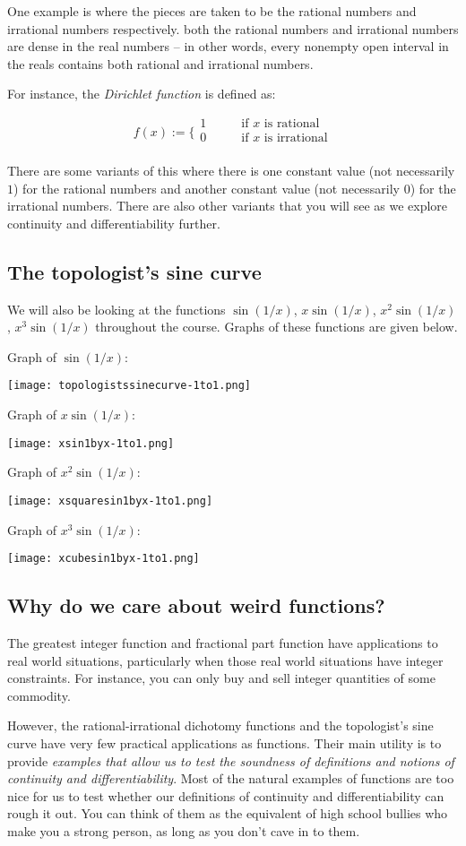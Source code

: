 \documentclass{amsart}
\begin{document}
One example is where the pieces are taken to be the rational numbers
and irrational numbers respectively. both the rational numbers and
irrational numbers are dense in the real numbers -- in other words,
every nonempty open interval in the reals contains both rational and
irrational numbers.

For instance, the {\em Dirichlet function} is defined as:

\begin{equation*}
  f(x) := \lbrace\begin{array}{rl}1 & \qquad \text{if $x$ is rational}\\0 & \qquad \text{if $x$ is irrational}\\\end{array}
\end{equation*}

There are some variants of this where there is one constant value (not
necessarily $1$) for the rational numbers and another constant value
(not necessarily $0$) for the irrational numbers. There are also other
variants that you will see as we explore continuity and
differentiability further.

\subsection{The topologist's sine curve}

We will also be looking at the functions $\sin(1/x)$, $x\sin(1/x)$,
$x^2\sin(1/x)$, $x^3\sin(1/x)$ throughout the course. Graphs of these
functions are given below.

Graph of $\sin(1/x)$:

\texttt{[image: topologistssinecurve-1to1.png]}

Graph of $x\sin(1/x)$:

\texttt{[image: xsin1byx-1to1.png]}

Graph of $x^2\sin(1/x)$:

\texttt{[image: xsquaresin1byx-1to1.png]}

Graph of $x^3\sin(1/x)$:

\texttt{[image: xcubesin1byx-1to1.png]}
 
\subsection{Why do we care about weird functions?}

The greatest integer function and fractional part function have
applications to real world situations, particularly when those real
world situations have integer constraints. For instance, you can only
buy and sell integer quantities of some commodity.

However, the rational-irrational dichotomy functions and the
topologist's sine curve have very few practical applications as
functions. Their main utility is to provide {\em examples that allow
us to test the soundness of definitions and notions of continuity and
differentiability}. Most of the natural examples of functions are too
nice for us to test whether our definitions of continuity and
differentiability can rough it out. You can think of them as the
equivalent of high school bullies who make you a strong person, as
long as you don't cave in to them.
\end{document}
